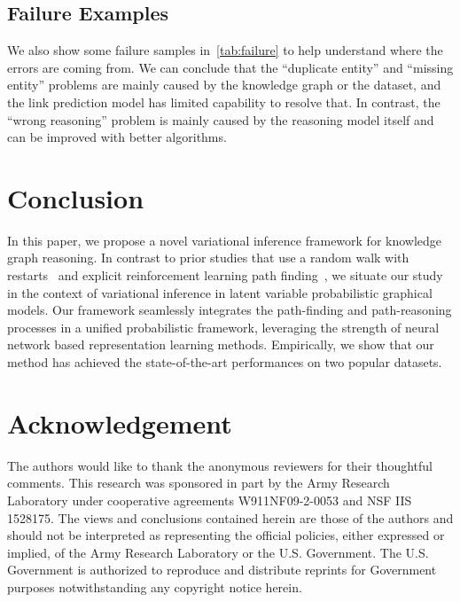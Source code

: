 \documentclass[11pt,a4paper]{article}
\begin{document}
\subsection{Failure Examples}
We also show some failure samples in~\autoref{tab:failure} to help understand where the errors are coming from. We can conclude that the ``duplicate entity'' and ``missing entity'' problems are mainly caused by the knowledge graph or the dataset, and the link prediction model has limited capability to resolve that. In contrast, the ``wrong reasoning'' problem is mainly caused by the reasoning model itself and can be improved with better algorithms.


\section{Conclusion}
\label{sec:conclusion}
In this paper, we propose a novel variational inference framework for knowledge graph reasoning. In contrast to prior studies that use a random walk with restarts~\cite{lao2011random} and explicit reinforcement learning path finding~\cite{xiong2017deeppath}, we situate our study in the context of variational inference in latent variable probabilistic graphical models. Our framework seamlessly integrates the path-finding and path-reasoning processes in a unified probabilistic framework, leveraging the strength of neural network based representation learning methods. Empirically, we show that our method has achieved the state-of-the-art performances on two popular datasets.

\section{Acknowledgement}
The authors would like to thank the anonymous reviewers for their thoughtful comments. This research
was sponsored in part by the Army Research Laboratory under cooperative agreements W911NF09-2-0053 and NSF IIS 1528175. The views and conclusions contained herein are those of the authors and should not be interpreted as representing the official policies, either expressed or implied, of the Army Research Laboratory or the U.S. Government. The U.S. Government is authorized to reproduce and distribute reprints for Government purposes notwithstanding any copyright notice herein.

%
%


\appendix

\end{document}
